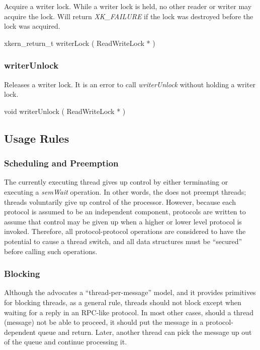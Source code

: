 Acquire a writer lock.  While a writer lock is held, no other reader
or writer may acquire the lock.  
Will return {\em XK\_FAILURE} if the lock was destroyed before
the lock was acquired.

\medskip
{\sem xkern\_return\_t} {\bold writerLock} ( {\sem ReadWriteLock} * )


\subsubsection{writerUnlock}

Releases a writer lock.  It is an error to call {\em writerUnlock}
without holding a writer lock.

\medskip
{\sem void} {\bold writerUnlock} ( {\sem ReadWriteLock} * )



\subsection{Usage Rules}

\subsubsection{Scheduling and Preemption}

The currently executing thread gives up control by either terminating
or executing a {\em semWait} operation.  In other words, the \xk{}
does not preempt threads; threads voluntarily give up control of the
processor.  However, because each protocol is assumed to be an
independent component, protocols are written to assume that control
may be given up when a higher or lower level protocol is invoked.
Therefore, all protocol-protocol operations are considered to have the
potential to cause a thread switch, and all data structures must be
``secured'' before calling such operations.

\subsubsection{Blocking}

Although the \xk{} advocates a ``thread-per-message'' model, and it
provides primitives for blocking threads, as a general rule, threads
should not block except when waiting for a reply in an RPC-like
protocol. In most other cases, should a thread (message) not be able
to proceed, it should put the message in a protocol-dependent queue
and return. Later, another thread can pick the message up out of the
queue and continue processing it.

